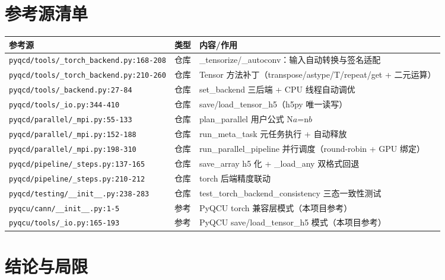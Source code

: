 \documentclass[UTF8]{ctexart}
\begin{document}
\section{参考源清单}

\begin{xltabular}{\textwidth}{llX}
\toprule
\textcolor{evidence}{参考源} & 类型 & 内容/作用 \\
\midrule
\endhead
\texttt{\nolinkurl{pyqcd/tools/_torch_backend.py:168-208}} & 仓库 & \_tensorize/\_autoconv：输入自动转换与签名适配 \\
\texttt{\nolinkurl{pyqcd/tools/_torch_backend.py:210-260}} & 仓库 & Tensor 方法补丁（transpose/astype/T/repeat/get + 二元运算） \\
\texttt{\nolinkurl{pyqcd/tools/_backend.py:27-84}} & 仓库 & set\_backend 三后端 + CPU 线程自动调优 \\
\texttt{\nolinkurl{pyqcd/tools/_io.py:344-410}} & 仓库 & save/load\_tensor\_h5（h5py 唯一读写） \\
\texttt{\nolinkurl{pyqcd/parallel/_mpi.py:55-133}} & 仓库 & plan\_parallel 用户公式 N$a$=n$b$ \\
\texttt{\nolinkurl{pyqcd/parallel/_mpi.py:152-188}} & 仓库 & run\_meta\_task 元任务执行 + 自动释放 \\
\texttt{\nolinkurl{pyqcd/parallel/_mpi.py:198-310}} & 仓库 & run\_parallel\_pipeline 并行调度（round-robin + GPU 绑定） \\
\texttt{\nolinkurl{pyqcd/pipeline/_steps.py:137-165}} & 仓库 & save\_array h5 化 + \_load\_any 双格式回退 \\
\texttt{\nolinkurl{pyqcd/pipeline/_steps.py:210-212}} & 仓库 & torch 后端精度联动 \\
\texttt{\nolinkurl{pyqcd/testing/__init__.py:238-283}} & 仓库 & test\_torch\_backend\_consistency 三态一致性测试 \\
\texttt{\nolinkurl{pyqcu/cann/__init__.py:1-5}} & 参考 & PyQCU torch 兼容层模式（本项目参考） \\
\texttt{\nolinkurl{pyqcu/tools/_io.py:165-193}} & 参考 & PyQCU save/load\_tensor\_h5 模式（本项目参考） \\
\bottomrule
\end{xltabular}

\section{结论与局限}
\end{document}
